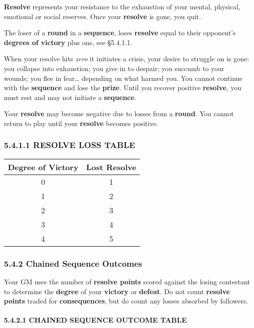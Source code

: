\documentclass[
  11pt,
]{article}
\begin{document}
\textbf{Resolve} represents your resistance to the exhaustion of your
mental, physical, emotional or social reserves. Once your
\textbf{resolve} is gone, you quit.

The loser of a \textbf{round} in a \textbf{sequence}, loses
\textbf{resolve} equal to their opponent's \textbf{degrees of victory}
plus one, see §5.4.1.1.

When your resolve hits \emph{zero} it initiates a crisis, your desire to
struggle on is gone: you collapse into exhaustion; you give in to
despair; you succumb to your wounds; you flee in fear\ldots{} depending
on what harmed you. You cannot continue with the \textbf{sequence} and
lose the \textbf{prize}. Until you recover positive \textbf{resolve},
you must rest and may not initiate a \textbf{sequence}.

Your \textbf{resolve} may become negative due to losses from a
\textbf{round}. You cannot return to play until your \textbf{resolve}
becomes positive.

\hypertarget{resolve-loss-table}{%
\subsubsection{5.4.1.1 RESOLVE LOSS TABLE}\label{resolve-loss-table}}

\begin{longtable}[]{@{}cc@{}}
\toprule
Degree of Victory & Lost Resolve \\
\midrule
\endhead
0 & 1 \\
1 & 2 \\
2 & 3 \\
3 & 4 \\
4 & 5 \\
\bottomrule
\end{longtable}

\hypertarget{chained-sequence-outcomes}{%
\subsubsection{5.4.2 Chained Sequence
Outcomes}\label{chained-sequence-outcomes}}

Your GM uses the number of \textbf{resolve points} scored against the
losing contestant to determine the \textbf{degree} of your
\textbf{victory} or \textbf{defeat}. Do not count \textbf{resolve
points} traded for \textbf{consequences}, but do count any losses
absorbed by followers.

\hypertarget{chained-sequence-outcome-table}{%
\paragraph{5.4.2.1 CHAINED SEQUENCE OUTCOME
TABLE}\label{chained-sequence-outcome-table}}
\end{document}
